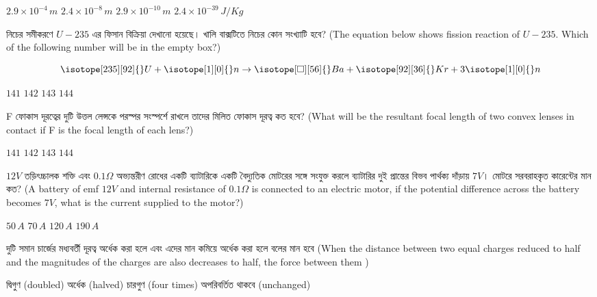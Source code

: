 \documentclass[addpoints]{exam}
\begin{document}
\begin{questions}
\begin{oneparchoices}
\choice $ 2.9\times 10^{-4}\,m $
\choice $ 2.4\times 10^{-8}\,m $
\choice $ 2.9\times 10^{-10}\,m $
\choice $ 2.4\times 10^{-39}\,J/Kg $
\end{oneparchoices}

\question  নিচের সমীকরণে $ U-235 $ এর ফিসান বিক্রিয়া দেখানো হয়েছে। খালি বাক্সটিতে নিচের কোন সংখ্যাটি হবে? (The equation below shows fission reaction of $ U-235 $. Which of the following number will be in the empty box?)

\[ \isotope[235][92]{}U+  \isotope[1][0]{}n \to \isotope[\square][56]{}Ba + \isotope[92][36]{}Kr + 3\isotope[1][0]{}n \]

\begin{oneparchoices}
\choice $ 141 $
\choice $ 142 $
\choice $ 143 $
\choice $ 144 $
\end{oneparchoices}

\question   F ফোকাস দূরত্বের দুটি উত্তল লেন্সকে পরস্পর সংস্পর্শে রাখলে তাদের মিলিত ফোকাস দূরত্ব কত হবে? (What will be the resultant focal length of two convex lenses in contact if F is the focal length of each lens?)

\begin{oneparchoices}
\choice $ 141 $
\choice $ 142 $
\choice $ 143 $
\choice $ 144 $
\end{oneparchoices}



\question $ 12 V $ তড়িৎচ্চালক শক্তি এবং $ 0.1\Omega $ অভ্যন্তরীণ রোধের একটি ব্যাটারিকে  একটি বৈদ্যুতিক মোটরের সঙ্গে সংযুক্ত করলে ব্যাটারির দুই প্রান্তের বিভব পার্থক্য দাঁড়ায় $ 7 V $। মোটরে সরবরাহকৃত কারেন্টের মান কত? (A battery of emf $ 12 V $ and internal resistance of $ 0.1\Omega $ is connected to an electric motor, if the potential difference across the battery becomes $ 7 V $, what is the current supplied to the motor?)

\begin{oneparchoices}
\choice $ 50\,A $
\choice $ 70\,A $
\choice $ 120\,A $
\choice $ 190\,A $
\end{oneparchoices}

\question দুটি সমান চার্জের মধ্যবর্তী দূরত্ব অর্ধেক করা হলে এবং এদের মান কমিয়ে অর্ধেক করা হলে বলের মান হবে (When the distance between two equal charges reduced to half and the magnitudes of the charges are also decreases to half, the force between them )


\begin{oneparchoices}
\choice দ্বিগুণ (doubled)
\hspace*{-.4cm}\choice অর্ধেক (halved)
\hspace*{-.4cm}\choice চারগুণ (four times)
\hspace*{-.4cm}\choice অপরিবর্তিত থাকবে (unchanged)
\end{oneparchoices}


\end{questions}
\end{document}

